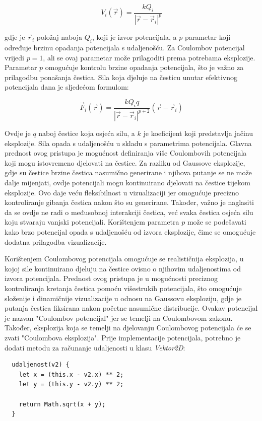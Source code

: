 \documentclass{foi}
\begin{document}
\[
V_i(\vec{r}) = \frac{k Q_i}{|\vec{r} - \vec{r}_i|^p}
\]

gdje je \(\vec{r}_i\) položaj naboja \(Q_i\), koji je izvor potencijala, a \(p\) parametar koji određuje brzinu opadanja potencijala s udaljenošću. Za Coulombov potencijal vrijedi \(p = 1\), ali se ovaj parametar može prilagoditi prema potrebama eksplozije. Parametar \(p\) omogućuje kontrolu brzine opadanja potencijala, što je važno za prilagodbu ponašanja čestica. Sila koja djeluje na česticu unutar efektivnog potencijala dana je sljedećom formulom:

\[
\vec{F}_i(\vec{r}) = \frac{k Q_i q}{|\vec{r} - \vec{r}_i|^{p+2}} (\vec{r} - \vec{r}_i)
\]

Ovdje je \(q\) naboj čestice koja osjeća silu, a \(k\) je koeficijent koji predstavlja jačinu eksplozije. Sila opada s udaljenošću u skladu s parametrima potencijala. Glavna prednost ovog pristupa je mogućnost definiranja više Coulombovih potencijala koji mogu istovremeno djelovati na čestice. Za razliku od Gaussove eksplozije, gdje su čestice brzine čestica nasumično generirane i njihova putanje se ne može dalje mijenjati, ovdje potencijali mogu kontinuirano djelovati na čestice tijekom eksplozije. Ovo daje veću fleksibilnost u vizualizaciji jer omogućuje precizno kontroliranje gibanja čestica nakon što su generirane. Također, važno je naglasiti da se ovdje ne radi o međusobnoj interakciji čestica, već svaka čestica osjeća silu koju stvaraju vanjski potencijali. Korištenjem parametra \(p\) može se  podešavati kako brzo potencijal opada s udaljenošću od izvora eksplozije, čime se omogućuje dodatna prilagodba vizualizacije.

Korištenjem Coulombovog potencijala omogućuje se realističnija eksplozija, u kojoj sile kontinuirano djeluju na čestice ovisno o njihovim udaljenostima od izvora potencijala. Prednost ovog pristupa je u mogućnosti preciznog kontroliranja kretanja čestica pomoću višestrukih potencijala, što omogućuje složenije i dinamičnije vizualizacije u odnosu na Gaussovu eksploziju, gdje je putanja čestica fiksirana nakon početne nasumične distribucije. Ovakav potencijal je nazvan "Coulombov potencijal" jer se temelji na Coulombovom zakonu. Također, eksplozija koja se temelji na djelovanju Coulombovog potencijala će se zvati "Coulombova eksplozija". Prije implementacije potencijala, potrebno je dodati metodu za računanje udaljenosti u klasu \textit{Vektor2D}:

\begin{verbatim}
  udaljenost(v2) {
    let x = (this.x - v2.x) ** 2;
    let y = (this.y - v2.y) ** 2;

    return Math.sqrt(x + y);
  }
\end{verbatim}
\end{document}
